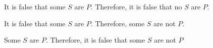 \begin{exercises}
\item It is false that some $S$ are $P$. Therefore, it is false that no $S$ are $P$.

\item It is false that some $S$ are $P$. Therefore, some $S$ are not $P$.

\item Some $S$ are $P$. Therefore, it is false that some $S$ are not $P$



\end{exercises}

